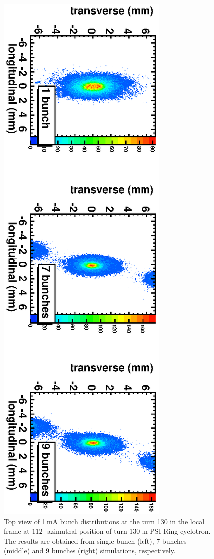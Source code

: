 \documentclass{JAC2003}
\begin{document}
\begin{figure}
  \centering
  \includegraphics[angle=90,width=1\linewidth]{figures/C9B7BSB-2D-1mA-130.ps}
  \caption{Top view of 1\,mA bunch distributions at the turn 130  in the local frame at $112^\circ$ azimuthal position of turn 130 in PSI Ring cyclotron.
    The results are obtained from single bunch (left), 7 bunches (middle) and 9 bunches (right) simulations, respectively.}
  \label{fig:NBcompare2D}
\end{figure}
\end{document}
